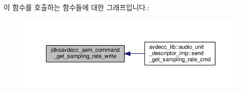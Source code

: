 이 함수를 호출하는 함수들에 대한 그래프입니다.\+:
\nopagebreak
\begin{figure}[H]
\begin{center}
\leavevmode
\includegraphics[width=350pt]{group__command__get__sampling__rate_ga37a4b44d1dbd77b1a74cbb48cf158a7a_icgraph}
\end{center}
\end{figure}


